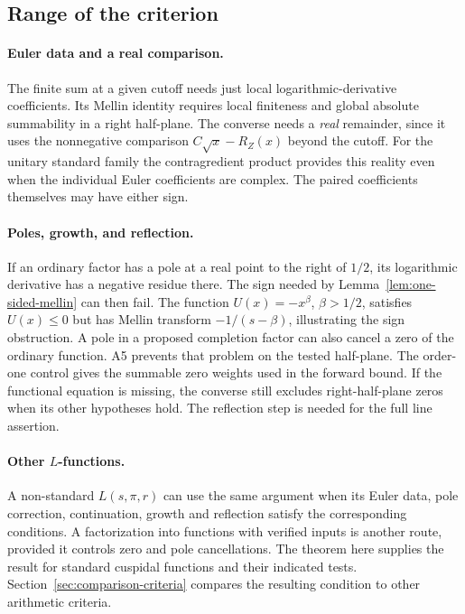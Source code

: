 \documentclass[11pt]{amsart}
\theoremstyle{definition}
\theoremstyle{remark}
\numberwithin{equation}{section}
\begin{document}
\subsection{Range of the criterion}\label{sec:triangular-scope}

\paragraph{Euler data and a real comparison.}
The finite sum at a given cutoff needs just local
logarithmic-derivative coefficients. Its Mellin identity
requires local finiteness and global absolute summability
in a right half-plane. The converse needs a \emph{real}
remainder, since it uses the nonnegative comparison
\(C\sqrt{x}-R_Z(x)\) beyond the cutoff. For the unitary
standard family the contragredient product provides this
reality even when the individual Euler coefficients are
complex. The paired coefficients themselves may have either sign.

\paragraph{Poles, growth, and reflection.}
If an ordinary factor has a pole at a real point to the right
of \(1/2\), its logarithmic derivative has a negative residue
there. The sign needed by Lemma~\ref{lem:one-sided-mellin}
can then fail. The function \(U(x)=-x^\beta\), \(\beta>1/2\),
satisfies \(U(x)\le0\) but has Mellin transform
\(-1/(s-\beta)\), illustrating the sign obstruction.
A pole in a proposed completion factor can also cancel
a zero of the ordinary function. A5 prevents that problem
on the tested half-plane. The order-one control gives the
summable zero weights used in the forward bound. If the
functional equation is missing, the converse still excludes
right-half-plane zeros when its other hypotheses hold.
The reflection step is needed for the full line assertion.

\paragraph{Other \(L\)-functions.}
A non-standard \(L(s,\pi,r)\) can use the same argument
when its Euler data, pole correction, continuation, growth
and reflection satisfy the corresponding conditions. A
factorization into functions with verified inputs is another
route, provided it controls zero and pole cancellations.
The theorem here supplies the result for standard cuspidal
functions and their indicated tests. Section~\ref{sec:comparison-criteria}
compares the resulting condition to other arithmetic criteria.
\end{document}
